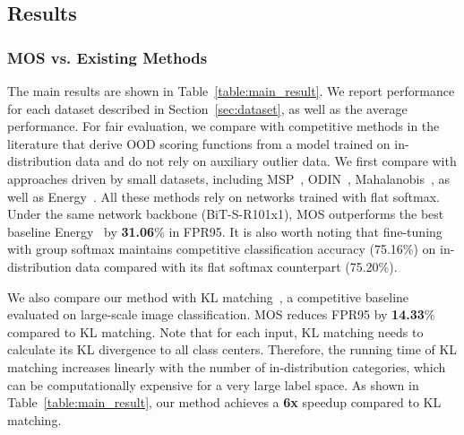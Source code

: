 \documentclass[final]{cvpr}
\begin{document}
\vspace{-0.1cm}
\subsection{Results}
\label{sec:exp_results}


\subsubsection{MOS vs. Existing Methods}
\label{sec:exp_main_results}
\vspace{-0.2cm}
The main results are shown in Table~\ref{table:main_result}. We report performance for each dataset described in Section~\ref{sec:dataset}, as well as the average performance. For fair evaluation, we compare with competitive methods in the literature that derive OOD scoring functions from a model trained on in-distribution data and do not rely on auxiliary outlier data. We first compare with approaches driven by small datasets, including MSP~\cite{hendrycks2016baseline}, ODIN~\cite{liang2018enhancing}, Mahalanobis~\cite{lee2018simple}, as well as Energy~\cite{liu2020energy}. All these methods rely on networks trained with flat softmax. Under the same network backbone (BiT-S-R101x1), MOS outperforms the best baseline Energy~\cite{liu2020energy} by \textbf{31.06}\% in FPR95. It is also worth noting that fine-tuning with group softmax maintains competitive classification accuracy (75.16\%) on in-distribution data compared with its flat softmax counterpart (75.20\%).

We also compare our method with KL matching~\cite{hendrycks2019benchmark}, a competitive baseline evaluated on large-scale image classification. MOS reduces FPR95 by \textbf{14.33}\% compared to KL matching. Note that for each input, KL matching needs to calculate its KL divergence to all class centers.
Therefore, the running time of KL matching increases linearly with the number of in-distribution categories, which can be computationally expensive for a very large label space. As shown in Table~\ref{table:main_result}, our method achieves a \textbf{6x} speedup compared to KL matching.


















\vspace{-0.3cm}
\end{document}
